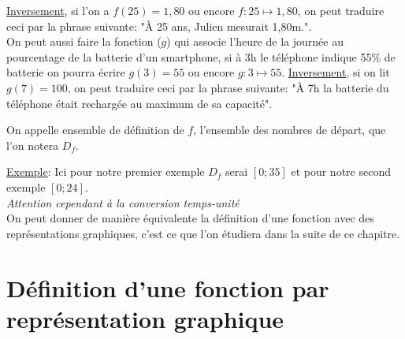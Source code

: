 \documentclass[french]{book}
\begin{document}
\underline{Inversement}, si l'on a $f(25)=1,80 $ ou encore $f:25 \mapsto 1,80$, on peut traduire ceci par la phrase suivante: "À 25 ans, Julien mesurait 1,80m.". \\


On peut aussi faire la fonction ($g$) qui associe l'heure de la journée au pourcentage de la batterie d'un smartphone, si à 3h le téléphone indique 55\% de batterie on pourra écrire $g(3)=55$ ou encore $g:3 \mapsto 55$.
\underline{Inversement}, si on lit $g(7)=100$, on peut traduire ceci par la phrase suivante: "À 7h la batterie du téléphone était rechargée au maximum de sa capacité".

\begin{defn}
On appelle ensemble de définition de $f$, l'ensemble des nombres de départ, que l'on notera $D_f$.
\vspace{4mm}

\end{defn}

\underline{Exemple}: Ici pour notre premier exemple $D_f$ serai $[0;35]$ et pour notre second exemple $[0;24]$.\\ \emph{Attention cependant à la conversion temps-unité}\\





On peut donner de manière équivalente la définition d'une fonction avec des représentations graphiques, c'est ce que l'on étudiera dans la suite de ce chapitre.

\newpage

\section{Définition d'une fonction par représentation graphique}
\end{document}
